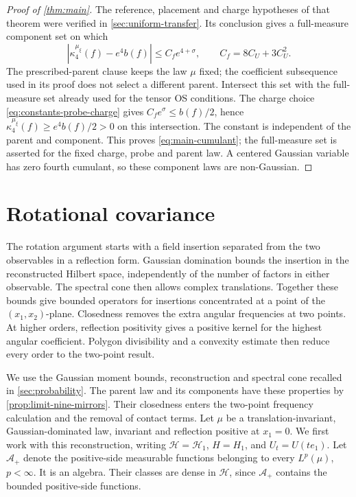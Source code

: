 \begin{proof}[Proof of \cref{thm:main}]
The reference, placement and charge hypotheses of that theorem
were verified in \cref{sec:uniform-transfer}. Its conclusion
 gives a full-measure component set on which
\[
 |\kappa_4^{\mu_\xi}(f)-e^4b(f)|\le C_fe^{4+\sigma},
 \qquad C_f=8C_U+3C_U^2.
\]
The prescribed-parent clause keeps the law $\mu$ fixed;
the coefficient subsequence used in its proof does not select
a different parent. Intersect this set with the full-measure
set already used for the tensor OS conditions.
The charge choice \eqref{eq:constants-probe-charge} gives
$C_fe^\sigma\le b(f)/2$, hence
$\kappa_4^{\mu_\xi}(f)\ge e^4b(f)/2>0$ on this intersection.
The constant is independent of the parent and component.
This proves \eqref{eq:main-cumulant}; the full-measure set
is asserted for the fixed charge, probe and parent law.
A centered Gaussian variable has zero fourth cumulant, so
these component laws are non-Gaussian.
\end{proof}
\section{Rotational covariance}\label{sec:rotations}

The rotation argument starts with a field insertion separated from
the two observables in a reflection form. Gaussian domination bounds
the insertion in the reconstructed Hilbert space, independently of
the number of factors in either observable. The spectral cone then
allows complex translations. Together these bounds give bounded
operators for insertions concentrated at a point of the
$(x_1,x_2)$-plane. Closedness removes the extra angular frequencies
at two points. At higher orders, reflection positivity gives a positive
kernel for the highest angular coefficient. Polygon divisibility and a
convexity estimate then reduce every order to the two-point result.


We use the Gaussian moment bounds, reconstruction and spectral cone
recalled in \cref{sec:probability}. The parent law and its components
have these properties by \cref{prop:limit-nine-mirrors}. Their
closedness enters the two-point frequency calculation and the
removal of contact terms.
Let $\mu$ be a translation-invariant, Gaussian-dominated law,
invariant and reflection positive at $x_1=0$.
We first work with this reconstruction, writing
$\mathcal H=\mathcal H_1$, $H=H_1$, and
$U_t=U(te_1)$.
Let $\mathcal A_+$ denote the positive-side measurable functions
belonging to every $L^p(\mu)$, $p<\infty$. It is an algebra.
Their classes are dense in $\mathcal H$, since $\mathcal A_+$
contains the bounded positive-side functions.

